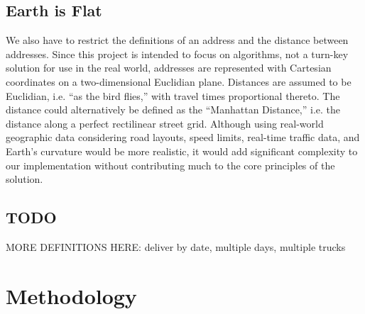 \documentclass[letterpaper]{article}
\begin{document}
    \subsection{Earth is Flat}
    \label{subection:Earth_is_Flat}
    We also have to restrict the definitions of an address and the distance between addresses. Since this project is intended to focus on algorithms, not a turn-key solution for use in the real world, addresses are represented with Cartesian coordinates on a two-dimensional Euclidian plane. Distances are assumed to be Euclidian, i.e. ``as the bird flies,'' with travel times proportional thereto. The distance could alternatively be defined as the ``Manhattan Distance,'' i.e. the distance along a perfect rectilinear street grid. Although using real-world geographic data considering road layouts, speed limits, real-time traffic data, and Earth's curvature would be more realistic, it would add significant complexity to our implementation without contributing much to the core principles of the solution.

    \subsection{TODO}
    MORE DEFINITIONS HERE: deliver by date, multiple days, multiple trucks

    \section{Methodology}
    \label{section:Methodology}
\end{document}
